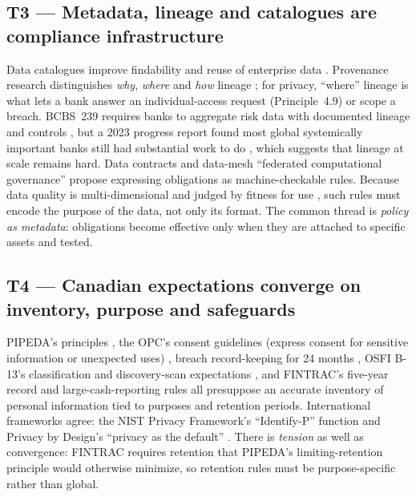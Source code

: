 \documentclass[journal,onecolumn,11pt]{IEEEtran}
\begin{document}
\subsection{T3 --- Metadata, lineage and catalogues are compliance infrastructure}
Data catalogues improve findability and reuse of enterprise data \cite{labadie}. Provenance research distinguishes \emph{why}, \emph{where} and \emph{how} lineage \cite{herschel}; for privacy, ``where'' lineage is what lets a bank answer an individual-access request (Principle~4.9) or scope a breach. BCBS~239 requires banks to aggregate risk data with documented lineage and controls \cite{bcbs239}, but a 2023 progress report found most global systemically important banks still had substantial work to do \cite{bcbs_progress}, which suggests that lineage at scale remains hard. Data contracts \cite{jones_contracts} and data-mesh ``federated computational governance'' \cite{dehghani} propose expressing obligations as machine-checkable rules. Because data quality is multi-dimensional and judged by fitness for use \cite{wangstrong}, such rules must encode the purpose of the data, not only its format. The common thread is \emph{policy as metadata}: obligations become effective only when they are attached to specific assets and tested.

\subsection{T4 --- Canadian expectations converge on inventory, purpose and safeguards}
PIPEDA's principles \cite{pipeda}, the OPC's consent guidelines (express consent for sensitive information or unexpected uses) \cite{opc_consent}, breach record-keeping for 24 months \cite{breachregs}, OSFI B-13's classification and discovery-scan expectations \cite{osfi_b13}, and FINTRAC's five-year record and large-cash-reporting rules \cite{fintrac_records,fintrac_lctr} all presuppose an accurate inventory of personal information tied to purposes and retention periods. International frameworks agree: the NIST Privacy Framework's ``Identify-P'' function \cite{nist_pf} and Privacy by Design's ``privacy as the default'' \cite{cavoukian}. There is \emph{tension} as well as convergence: FINTRAC requires retention that PIPEDA's limiting-retention principle would otherwise minimize, so retention rules must be purpose-specific rather than global.
\end{document}
